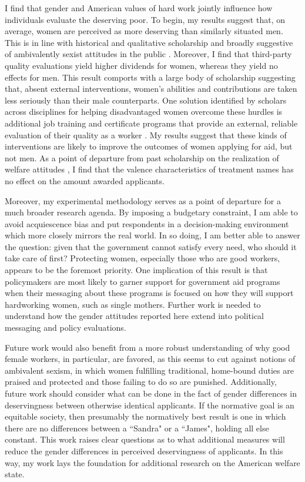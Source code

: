 \documentclass[12pt]{article}%
\begin{document}
\begin{doublespace}
I find that gender and American values of hard work jointly influence how individuals evaluate the deserving poor. To begin, my results suggest that, on average, women are perceived as more deserving than similarly situated men. This is in line with historical and qualitative scholarship \cite{willrich2000home} and broadly suggestive of ambivalently sexist attitudes in the public \citep{glick_ambivalent_2001, glick_hostile_1997}. Moreover, I find that third-party quality evaluations yield higher dividends for women, whereas they yield no effects for men. This result comports with a large body of scholarship suggesting that, absent external interventions, women's abilities and contributions are taken less seriously than their male counterparts. One solution identified by scholars across disciplines for helping disadvantaged women overcome these hurdles is additional job training and certificate programs that provide an external, reliable evaluation of their quality as a worker \citep{abel_value_2020, dadgar_labor_2015, jepsen_labor-market_2014}. My results suggest that these kinds of interventions are likely to improve the outcomes of women applying for aid, but not men. As a point of departure from past scholarship on the realization of welfare attitudes \citep{hayes_2020}, I find that the valence characteristics of treatment names has no effect on the amount awarded applicants.

Moreover, my experimental methodology serves as a point of departure for a much broader research agenda. By imposing a budgetary constraint, I am able to avoid acquiescence bias and put respondents in a decision-making environment which more closely mirrors the real world. In so doing, I am better able to answer the question: given that the government cannot satisfy every need, who should it take care of first? Protecting women, especially those who are good workers, appears to be the foremost priority. One implication of this result is that policymakers are most likely to garner support for government aid programs when their messaging about these programs is focused on how they will support hardworking women, such as single mothers. Further work is needed to understand how the gender attitudes reported here extend into political messaging and policy evaluations.

Future work would also benefit from a more robust understanding of why good female workers, in particular, are favored, as this seems to cut against notions of ambivalent sexism, in which women fulfilling traditional, home-bound duties are praised and protected and those failing to do so are punished. Additionally, future work should consider what can be done in the fact of gender differences in deservingness between otherwise identical applicants. If the normative goal is an equitable society, then presumably the normatively best result is one in which there are no differences between a ``Sandra" or a ``James", holding all else constant. This work raises clear questions as to what additional measures will reduce the gender differences in perceived deservingness of applicants. In this way, my work lays the foundation for additional research on the American welfare state.

\end{doublespace}

\pagebreak


\end{document}
